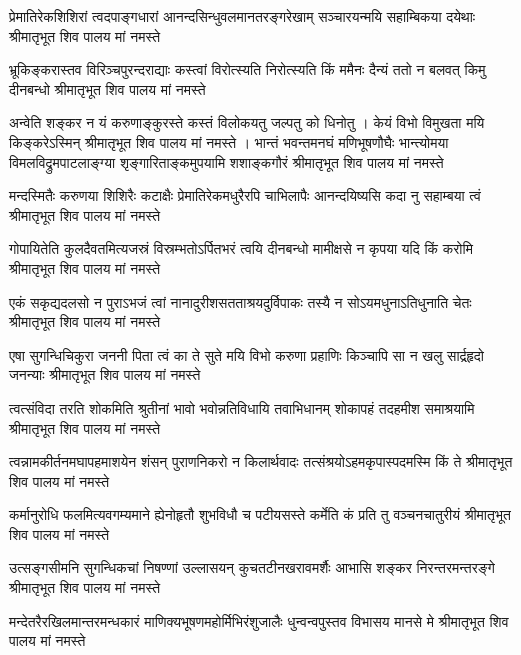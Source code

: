 \fourlineindentedshloka
{प्रेमातिरेकशिशिरां त्वदपाङ्गधारां}
{आनन्दसिन्धुवलमानतरङ्गरेखाम्}
{सञ्चारयन्मयि सहाम्बिकया दयेथाः}
{श्रीमातृभूत शिव पालय मां नमस्ते} %

\fourlineindentedshloka
{भ्रूकिङ्करास्तव विरिञ्चपुरन्दराद्याः}
{कस्त्वां विरोत्स्यति निरोत्स्यति किं ममैनः}
{दैन्यं ततो न बलवत् किमु दीनबन्धो}
{श्रीमातृभूत शिव पालय मां नमस्ते} %

अन्वेति शङ्कर न यं करुणाङ्कुरस्ते
कस्तं विलोकयतु जल्पतु को धिनोतु ।
केयं विभो विमुखता मयि किङ्करेऽस्मिन्
श्रीमातृभूत शिव पालय मां नमस्ते ।
\fourlineindentedshloka
{भान्तं भवन्तमनघं मणिभूषणौघैः}
{भान्त्योमया विमलविद्रुमपाटलाङ्ग्या}
{श‍ृङ्गारिताङ्कमुपयामि शशाङ्कगौरं}
{श्रीमातृभूत शिव पालय मां नमस्ते} %

\fourlineindentedshloka
{मन्दस्मितैः करुणया शिशिरैः कटाक्षैः}
{प्रेमातिरेकमधुरैरपि चाभिलापैः}
{आनन्दयिष्यसि कदा नु सहाम्बया त्वं}
{श्रीमातृभूत शिव पालय मां नमस्ते} %

\fourlineindentedshloka
{गोपायितेति कुलदैवतमित्यजस्रं}
{विस्रम्भतोऽर्पितभरं त्वयि दीनबन्धो}
{मामीक्षसे न कृपया यदि किं करोमि}
{श्रीमातृभूत शिव पालय मां नमस्ते} %

\fourlineindentedshloka
{एकं सकृद्यदलसो न पुराऽभजं त्वां}
{नानादुरीशसतताश्रयदुर्विपाकः}
{तस्यै न सोऽयमधुनाऽतिधुनाति चेतः}
{श्रीमातृभूत शिव पालय मां नमस्ते} %

\fourlineindentedshloka
{एषा सुगन्धिचिकुरा जननी पिता त्वं}
{का ते सुते मयि विभो करुणा प्रहाणिः}
{किञ्चापि सा न खलु सार्द्रहृदो जनन्याः}
{श्रीमातृभूत शिव पालय मां नमस्ते} %

\fourlineindentedshloka
{त्वत्संविदा तरति शोकमिति श्रुतीनां}
{भावो भवोन्नतिविधायि तवाभिधानम्}
{शोकापहं तदहमीश समाश्रयामि}
{श्रीमातृभूत शिव पालय मां नमस्ते} %

\fourlineindentedshloka
{त्वन्नामकीर्तनमघापहमाशयेन}
{शंसन् पुराणनिकरो न किलार्थवादः}
{तत्संश्रयोऽहमकृपास्पदमस्मि किं ते}
{श्रीमातृभूत शिव पालय मां नमस्ते} %

\fourlineindentedshloka
{कर्मानुरोधि फलमित्यवगम्यमाने}
{ह्येनोहृतौ शुभविधौ च पटीयसस्ते}
{कर्मेति कं प्रति तु वञ्चनचातुरीयं}
{श्रीमातृभूत शिव पालय मां नमस्ते} %

\fourlineindentedshloka
{उत्सङ्गसीमनि सुगन्धिकचां निषण्णां}
{उल्लासयन् कुचतटीनखरावमर्शैः}
{आभासि शङ्कर निरन्तरमन्तरङ्गे}
{श्रीमातृभूत शिव पालय मां नमस्ते} %

\fourlineindentedshloka
{मन्देतरैरखिलमान्तरमन्धकारं}
{माणिक्यभूषणमहोर्मिभिरंशुजालैः}
{धुन्वन्वपुस्तव विभासय मानसे मे}
{श्रीमातृभूत शिव पालय मां नमस्ते} %

